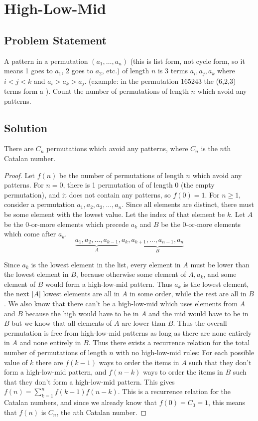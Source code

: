 \documentclass[12pt]{article}
\newcommand{\ProblemStatement}[1]{
\subsection*{Problem Statement}
#1
\subsection*{Solution}
}
\begin{document}
\section{High-Low-Mid}
\ProblemStatement{
A  pattern in a permutation $(a_1,\dots,a_n)$ (this is list form, not cycle form, so it means 1 goes to $a_1$, 2 goes to $a_2$, etc.) of length $n$ is 3 terms $a_i, a_j, a_k$ where $i < j < k$ and $a_i > a_k > a_j$. (example: in the permutation 165243 the (6,2,3) terms form a \say{high low mid}). Count the number of permutations of length $n$ which avoid any \say{high low mid} patterns.
}

There are $C_n$ permutations which avoid any  patterns, where $C_n$ is the $n$th Catalan number.

\begin{proof}
Let $f(n)$ be the number of permutations of length $n$ which avoid any  patterns. For $n=0$, there is 1 permutation of of length 0 (the empty permutation), and it does not contain any  patterns, so $f(0) = 1$. For $n \ge 1$, consider a permutation $a_1, a_2, a_3, \dots, a_n$. Since all elements are distinct, there must be some element with the lowest value. Let the index of that element be $k$. Let $A$ be the 0-or-more elements which precede $a_k$ and $B$ be the 0-or-more elements which come after $a_k$. 
\[
    \underbrace{a_1, a_2, \dots, a_{k-1}}_{A}, a_k, \underbrace{a_{k+1}, \dots, a_{n-1}, a_n}_{B}
\]

Since $a_k$ is the lowest element in the list, every element in $A$ must be lower than the lowest element in $B$, because otherwise some element of $A, a_k$, and some element of $B$ would form a high-low-mid pattern. Thus $a_k$ is the lowest element, the next $|A|$ lowest elements are all in $A$ in some order, while the rest are all in $B$. We also know that there can't be a high-low-mid which uses elements from $A$ and $B$ because the high would have to be in $A$ and the mid would have to be in $B$ but we know that all elements of $A$ are lower than $B$. Thus the overall permutation is free from high-low-mid patterns as long as there are none entirely in $A$ and none entirely in $B$. Thus there exists a recurrence relation for the  total number of permutations of length $n$ with no high-low-mid rules: For each possible value of $k$ there are $f(k-1)$ ways to order the items in $A$ such that they don't form a high-low-mid pattern, and $f(n-k)$ ways to order the items in $B$ such that they don't form a high-low-mid pattern. This gives $f(n) = \sum_{k=1}^nf(k-1)f(n-k)$. This is a recurrence relation for the Catalan numbers, and since we already know that $f(0) = C_0 = 1$, this means that $f(n)$ is $C_n$, the $n$th Catalan number.
\end{proof}
\end{document}

